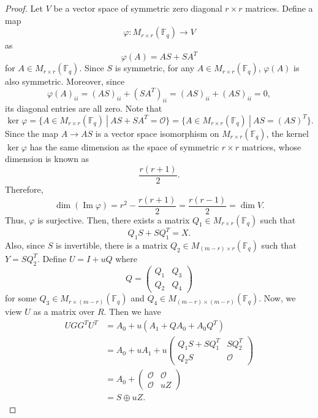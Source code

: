 \documentclass{article}
\theoremstyle{definition}
\theoremstyle{remark}
\begin{document}
\begin{proof}
    Let $V$ be a vector space of symmetric zero diagonal $r\times r$ matrices. Define a map
    \[
    \varphi:M_{r\times r}(\mathbb{F}_q)\to V
    \]
    as 
    \[
    \varphi(A)=AS+SA^T
    \]
    for $A\in M_{r\times r}(\mathbb{F}_q)$. Since $S$ is symmetric, for any $A\in M_{r\times r}(\mathbb{F}_q)$, $\varphi(A)$ is also symmetric. Moreover, since
    \[
    \varphi(A)_{ii}=(AS)_{ii}+(SA^T)_{ii}=(AS)_{ii}+(AS)_{ii}=0,
    \]
    its diagonal entries are all zero. Note that
    \[
    \ker \varphi=\{A\in M_{r\times r}(\mathbb{F}_q)~|~AS+SA^T=\mathcal{O}\}=\{A\in M_{r\times r}(\mathbb{F}_q)~|~AS=(AS)^T\}.
    \]
    Since the map $A\to AS$ is a vector space isomorphism on $M_{r\times r}(\mathbb{F}_q)$, the kernel $\ker \varphi$ has the same dimension as the space of symmetric $r\times r$ matrices, whose dimension is known as
    \[
    \frac{r(r+1)}{2}.
    \]
    Therefore,
    \[
    \dim(\operatorname{Im}\varphi)=r^2-\frac{r(r+1)}{2}=\frac{r(r-1)}{2}=\dim V.
    \]
    Thus, $\varphi$ is surjective. Then, there exists a matrix $Q_1\in M_{r\times r}(\mathbb{F}_q)$ such that
    \[
    Q_1S+SQ_1^T=X.
    \]
    Also, since $S$ is invertible, there is a matrix $Q_2\in M_{(m-r)\times r}(\mathbb{F}_q)$ such that $Y=SQ_2^T$.
    Define $U=I+uQ$ where
    \[
    Q=\begin{pmatrix}
        Q_1 & Q_3\\Q_2 & Q_4
    \end{pmatrix}
    \]
    for some $Q_3\in M_{r\times (m-r)}(\mathbb{F}_q)$ and $Q_4\in M_{(m-r)\times (m-r)}(\mathbb{F}_q)$. Now, we view $U$ as a matrix over $R$. Then we have
    \begin{align*}
    UGG^TU^T&=A_0+u(A_1+QA_0+A_0Q^T)\\
    &=A_0+uA_1+u\begin{pmatrix}
        Q_1S+SQ_1^T & SQ_2^T\\Q_2S & \mathcal{O}
    \end{pmatrix}\\
    &=A_0+\begin{pmatrix}
        \mathcal{O} & \mathcal{O}\\\mathcal{O} & uZ
    \end{pmatrix}\\&=S\oplus uZ.
    \end{align*}
    

\end{proof}
\end{document}
